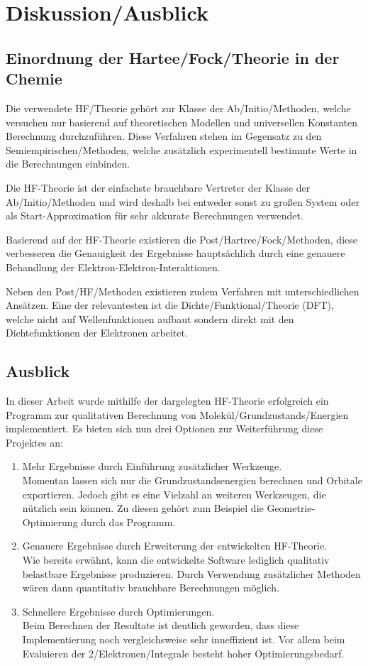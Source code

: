 \chapter{Diskussion/Ausblick}

\section{Einordnung der Hartee\-/Fock\-/Theorie in der Chemie}
Die verwendete HF\-/Theorie gehört zur Klasse der Ab\-/Initio\-/Methoden,
welche versuchen nur basierend auf theoretischen Modellen und
universellen Konstanten Berechnung durchzuführen.
Diese Verfahren stehen im Gegensatz zu den Semiempirischen\-/Methoden,
welche zusätzlich experimentell bestimmte Werte in die Berechnungen einbinden.

Die HF-Theorie ist der einfachste brauchbare Vertreter
der Klasse der Ab\-/Initio\-/Methoden
und wird deshalb bei entweder sonst zu großen System oder
als Start-Approximation für sehr akkurate Berechnungen verwendet.
\cite[S. 433]{structure_2013}

Basierend auf der HF-Theorie existieren die Post\-/Hartree\-/Fock\-/Methoden,
diese verbesseren die Genauigkeit der Ergebnisse hauptsächlich
durch eine genauere Behandlung der Elektron-Elektron-Interaktionen.

Neben den Post\-/HF\-/Methoden existieren zudem Verfahren
mit unterschiedlichen Ansätzen. Eine der relevantesten ist
die Dichte\-/Funktional\-/Theorie (DFT), welche nicht auf
Wellenfunktionen aufbaut sondern direkt mit den
Dichtefunktionen der Elektronen arbeitet.

\section{Ausblick}
In dieser Arbeit wurde mithilfe der dargelegten HF-Theorie
erfolgreich ein Programm zur qualitativen Berechnung von Molekül\-/Grundzustands\-/Energien
implementiert. Es bieten sich nun drei Optionen zur Weiterführung diese Projektes an:
\begin{enumerate}
    \item Mehr Ergebnisse durch Einführung zusätzlicher Werkzeuge.\\
    Momentan lassen sich nur die Grundzustandsenergien berechnen und Orbitale exportieren.
    Jedoch gibt es eine Vielzahl an weiteren Werkzeugen, die nützlich sein können.
    Zu diesen gehört zum Beispiel die Geometrie-Optimierung durch das Programm. 
    \item Genauere Ergebnisse durch Erweiterung der entwickelten HF-Theorie.\\
    Wie bereits erwähnt, kann die entwickelte Software 
    lediglich qualitativ belastbare Ergebnisse produzieren.
    Durch Verwendung zusätzlicher Methoden wären dann
    quantitativ brauchbare Berechnungen möglich.
    \item Schnellere Ergebnisse durch Optimierungen.\\
    Beim Berechnen der Resultate ist deutlich geworden,
    dass diese Implementierung noch vergleichsweise sehr inneffizient ist.
    Vor allem beim Evaluieren der 2\-/Elektronen\-/Integrale besteht hoher Optimierungsbedarf.
\end{enumerate}